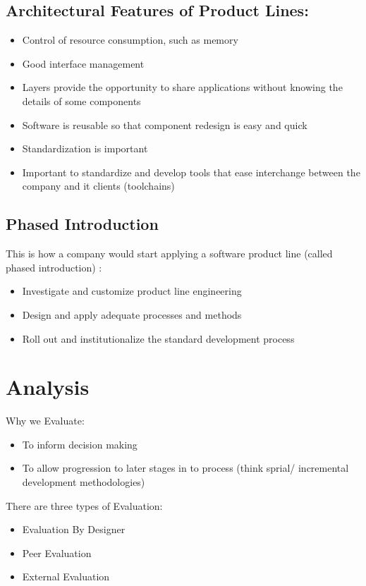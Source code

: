 \documentclass[a4paper]{article}
\begin{document}
\subsection{Architectural Features of Product Lines:}
\begin{itemize}
\item Control of resource consumption, such as memory
\item Good interface management
\item Layers provide the opportunity to share applications without knowing the details of some components
\item Software is reusable so that component redesign is easy and quick
\item Standardization is important
\item Important to standardize and develop tools that ease interchange between the company and it clients (toolchains)
\end{itemize}

\subsection{Phased Introduction}
This is how a company would start applying a software product line (called phased introduction) :
\begin{itemize}
\item Investigate and customize product line engineering
\item Design and apply adequate processes and methods
\item Roll out and institutionalize the standard development process
\end{itemize}

\newpage
\section{Analysis}
Why we Evaluate:
\begin{itemize}
\item To inform decision making
\item To allow progression to later stages in to process (think sprial/ incremental development methodologies)
\end{itemize}

There are three types of Evaluation:
\begin{itemize}
\item Evaluation By Designer
\item Peer Evaluation
\item External Evaluation
\end{itemize}
\end{document}

